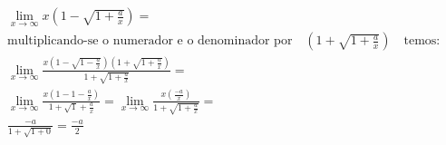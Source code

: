 \begin{ex}
\begin{align}
&\lim_{x\rightarrow \infty} x(1-\sqrt{1+\frac{a}{x}})=\nonumber\\
&\text{multiplicando-se o numerador e o denominador por}\quad(1+\sqrt{1+\frac{a}{x}})\quad\text{temos:}\nonumber\\
&\lim_{x\rightarrow \infty} \frac{x(1-\sqrt{1-\frac{a}{x}})(1+\sqrt{1+\frac{a}{x}})}{1+\sqrt{1+\frac{a}{x}}}=\nonumber\\
&\lim_{x\rightarrow \infty} \frac{x(1-1-\frac{a}{x})}{1+\sqrt1+\frac{a}{x}}=\lim_{x\rightarrow \infty} \frac{x(\frac{-a}{x})}{1+\sqrt{1+\frac{a}{x}}}=\nonumber\\
&\frac{-a}{1+\sqrt{1+0}}=\frac{-a}{2}\nonumber
\end{align}
\end{ex}